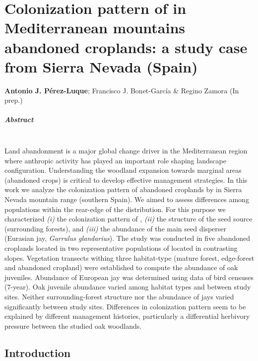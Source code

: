 %
\chapter{\textcolor{ctcolormain}{Colonization pattern of \Qp in Mediterranean mountains abandoned croplands: a study case from Sierra Nevada (Spain)}}\label{sec:coloniza}


\mbox{}
\vfill
{\color{ctcolormain}\textbf{Antonio J. Pérez-Luque}}; Francisco J. Bonet-García \& Regino Zamora (In prep.)


\newpage

\paragraph{Abstract} \mbox{} \\
Land abandonment is a major global change driver in the Mediterranean region where anthropic activity has played an important role shaping landscape configuration. Understanding the woodland expansion towards marginal areas (abandoned crops) is critical to develop effective management strategies. In this work we analyze the colonization pattern of abandoned croplands by \Qpy in Sierra Nevada mountain range (southern Spain). We aimed to assess differences among populations within the rear-edge of the \Qp distribution. For this purpose we characterized \emph{(i)} the colonization pattern of \Qp, \emph{(ii)} the structure of the seed source (surrounding forests), and \emph{(iii)} the abundance of the main seed disperser (Eurasian jay, \emph{Garrulus glandarius}). The study was conducted in five abandoned croplands located in two representative populations of \Qp located in contrasting slopes. Vegetation transects withing three habitat-type (mature forest, edge-forest and abandoned cropland) were established to compute the abundance of oak juveniles. Abundance of European jay was determined using data of bird censuses (7-year). Oak juvenile abundance varied among habitat types and between study sites. Neither surrounding-forest structure nor the abundance of jays varied significantly between study sites. Differences in colonization pattern seem to be explained by different management histories, particularly a differential herbivory pressure between the studied oak woodlands. 
\newpage

\section{Introduction}\label{sec:coloniza:intro}

